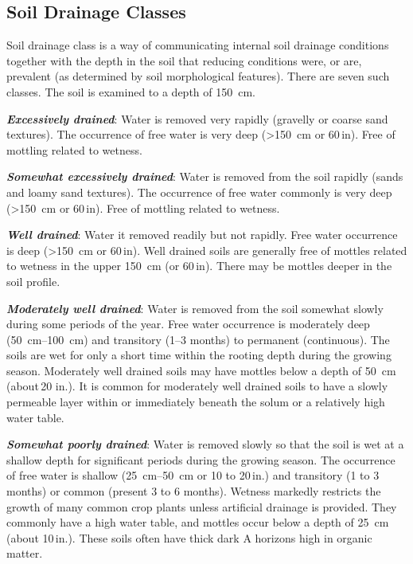 \documentclass[letterpaper, 12pt]{article}
\begin{document}
\subsection{Soil Drainage Classes}
\label{drainageclasses}

Soil drainage class is a way of communicating internal soil drainage conditions together with the depth in the soil that reducing conditions were, or are, prevalent (as determined by soil morphological features). There are seven such classes. The soil is examined to a depth of \qty{150}{cm}.

\textbf{\textit{Excessively drained}}: Water is removed very rapidly (gravelly or coarse sand textures). The occurrence of free water is very deep (\textgreater{}\qty{150}{cm} or 60\,in). Free of mottling related to wetness.

\textbf{\textit{Somewhat excessively drained}}: Water is removed from the soil rapidly (sands and loamy sand textures). The occurrence of free water commonly is very deep (\textgreater{}\qty{150}{cm} or 60\,in). Free of mottling related to wetness.

\textbf{\textit{Well drained}}: Water it removed readily but not rapidly. Free water occurrence is deep (\textgreater{}\qty{150}{cm} or 60\,in). Well drained soils are generally free of mottles related to wetness in the upper \qty{150}{cm} (or 60\,in). There may be mottles deeper in the soil profile.

\textbf{\textit{Moderately well drained}}: Water is removed from the soil somewhat slowly during some periods of the year. Free water occurrence is moderately deep (\qtyrange{50}{100}{cm}) and transitory (\numrange{1}{3} months) to permanent (continuous). The soils are wet for only a short time within the rooting depth during the growing season. Moderately well drained soils may have mottles below a depth of \qty{50}{cm} (about\,20 in.). It is common for moderately well drained soils to have a slowly permeable layer within or immediately beneath the solum or a relatively high water table.

\textbf{\textit{Somewhat poorly drained}}: Water is removed slowly so that the soil is wet at a shallow depth for significant periods during the growing season. The occurrence of free water is shallow (\qtyrange{25}{50}{cm} or 10 to 20\,in.) and transitory (1 to 3 months) or common (present 3 to 6 months). Wetness markedly restricts the growth of many common crop plants unless artificial drainage is provided. They commonly have a high water table, and mottles occur below a depth of \qty{25}{cm} (about 10\,in.). These soils often have thick dark A horizons high in organic matter.
\end{document}
